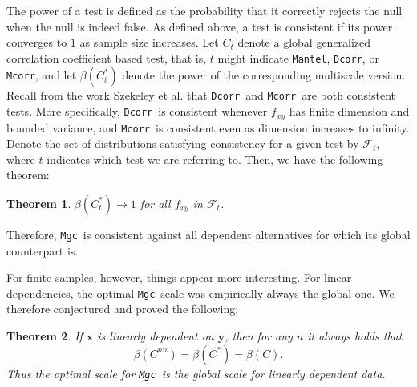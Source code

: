 \documentclass[11pt]{article}
\providecommand{\sct}[1]{{\sc \texttt{#1}}}
\providecommand{\mb}[1]{\boldsymbol{#1}}
\providecommand{\mc}[1]{\mathcal{#1}}
\newcommand{\G}{C}
\newcommand{\Mgc}{\sct{Mgc}}
\newcommand{\Dcorr}{\sct{Dcorr}}
\newcommand{\Mcorr}{\sct{Mcorr}}
\newcommand{\Mantel}{\sct{Mantel}}
\newtheorem{thm}{Theorem}
\begin{document}
The power of a test is defined as the probability that it correctly rejects the null when the null is indeed false.  As defined above, a test is consistent if its power converges to $1$ as sample size increases.
Let $\G_t$ denote a global generalized correlation coefficient based test, that is, $t$ might indicate \Mantel, \Dcorr, or \Mcorr, and let $\beta(\G_t^*)$ denote the power of the corresponding multiscale version.
Recall from the work Szekeley et al. that \Dcorr~and \Mcorr~are both consistent tests. More specifically, \Dcorr~is consistent whenever $f_{xy}$ has finite dimension and bounded variance, and \Mcorr~is consistent even as dimension increases to infinity.  Denote the set of distributions satisfying consistency for a given test by $\mc{F}_t$, where $t$ indicates which test we are referring to. Then, we have the following theorem:
\begin{thm}
\label{thm1}
$\beta(\G_t^*) \rightarrow 1$ for all $f_{xy}$ in $\mc{F}_t$.
\end{thm}

Therefore, \Mgc~is consistent against all dependent alternatives for which its global counterpart is. 

For finite samples, however, things appear more interesting.
For linear dependencies,  the optimal \Mgc~scale was empirically always the global one. We therefore conjectured and proved the following:
\begin{thm}
\label{t:linear}
If $\mb{x}$ is linearly dependent on $\mb{y}$, then for any $n$ it always holds that
\begin{equation}
\beta(\G^{nn}) = \beta(\G^{*}) = \beta(\G).
\end{equation}
Thus the optimal scale for \Mgc~is the global scale for linearly dependent data.
\end{thm}
\end{document}
